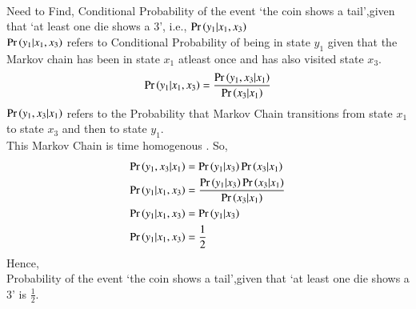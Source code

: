\documentclass[journal,12pt,twocolumn]{IEEEtran}
\begin{document}
\\ Need to Find, Conditional Probability of the event `the coin shows a tail',given that `at least one die shows a 3', i.e., $\Pr\left(y_1|x_1,x_3\right) $
\\$\Pr\left(y_1|x_1,x_3\right)$ refers to Conditional Probability of being in state $y_1$ given that the Markov chain has been in state $x_1$ atleast once and has also visited state $x_3$.
\begin{align}
       \Pr\left(y_1|x_1,x_3\right) = \frac{\Pr\left(y_1,x_3|x_1\right)}{\Pr\left(x_3|x_1\right)}
    \end{align}
$\Pr\left(y_1,x_3|x_1\right)$ refers to the Probability that Markov Chain transitions from state $x_1$ to state $x_3$ and then to state $y_1$.
\\This Markov Chain is time homogenous . So,
\begin{align}
        \Pr\left(y_1,x_3|x_1\right) &= \Pr\left(y_1|x_3\right)\Pr\left(x_3|x_1\right)\\
        \Pr\left(y_1|x_1,x_3\right) &=\frac{\Pr\left(y_1|x_3\right)\Pr\left(x_3|x_1\right)}{\Pr\left(x_3|x_1\right)}\\
        \Pr\left(y_1|x_1,x_3\right) &= \Pr\left(y_1|x_3\right)\\
        \Pr\left(y_1|x_1,x_3\right) &= \frac{1}{2}
    \end{align}
Hence,
\\Probability of the event `the coin shows a tail',given that `at least one die shows a 3' is $\frac{1}{2}$.
\end{document}
